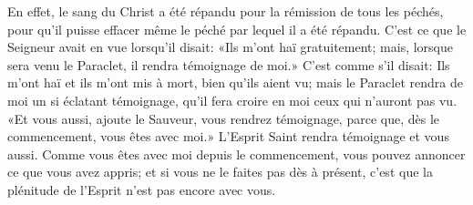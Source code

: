 En effet, le sang du Christ a été répandu pour la rémission de tous les péchés,
	pour qu’il puisse effacer même le péché par lequel il a été répandu.
C’est ce que le Seigneur avait en vue lorsqu’il disait:
	«Ils m’ont haï gratuitement;
	mais, lorsque sera venu le Paraclet, il rendra témoignage de moi.»
C’est comme s’il disait:
	Ils m’ont haï et ils m’ont mis à mort, bien qu’ils aient vu;
	mais le Paraclet rendra de moi un si éclatant témoignage,
	qu’il fera croire en moi ceux qui n’auront pas vu.
«Et vous aussi, ajoute le Sauveur, vous rendrez témoignage,
	parce que, dès le commencement, vous êtes avec moi.»
L’Esprit Saint rendra témoignage et vous aussi.
Comme vous êtes avec moi depuis le commencement,
	vous pouvez annoncer ce que vous avez appris;
	et si vous ne le faites pas dès à présent,
	c’est que la plénitude de l’Esprit n’est pas encore avec vous.
